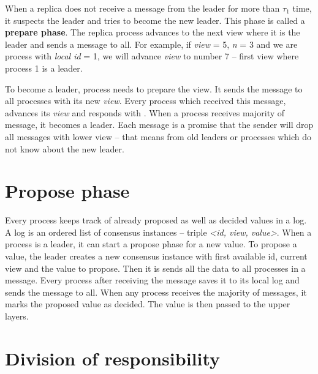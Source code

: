 \begin{TODO} %
When a replica does not receive a message from the leader for more than $\tau_1$ time, it suspects the leader and tries to become the new leader. This phase is called a \textbf{prepare phase}. The replica process advances to the next view where it is the leader and sends a \prepare message to all. For example, if \textit{view} = 5, \textit{n} = 3 and we are process with \textit{local id} = 1, we will advance \textit{view} to number 7 -- first view where process 1 is a leader.

To become a leader, process needs to prepare the view. It sends the \prepare message to all processes with its new \textit{view}. Every process which received this message, advances its \textit{view} and responds with \prepareOK[]. When a process receives majority of \prepareOK message, it becomes a leader. Each \prepareOK message is a promise that the sender will drop all messages with lower view -- that means from old leaders or processes which do not know about the new leader.
\end{TODO}


\section{Propose phase} 

Every process keeps track of already proposed as well as decided values in a log. A log is an ordered list of consensus instances -- triple \textit{<id, view, value>}. When a process is a leader, it can start a propose phase for a new value. To propose a value, the leader creates a new consensus instance with first available id, current view and the value to propose. Then it is sends all the data to all processes in a \propose message. Every process after receiving the \propose message saves it to its local log and sends the \accept message to all. When any process receives the majority of \accept messages, it marks the proposed value as decided. The value is then passed to the upper layers.


\section{Division of responsibility}

